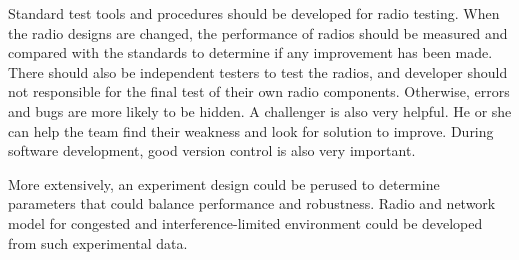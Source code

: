 Standard test tools and procedures should be developed for radio testing. When the radio designs are changed, the performance of radios should be measured and compared with the standards to determine if any improvement has been made. There should also be independent testers to test the radios, and developer should not responsible for the final test of their own radio components. Otherwise, errors and bugs are more likely to be hidden. A challenger is also very helpful. He or she can help the team find their weakness and look for solution to improve. During software development, good version control is also very important.

More extensively, an experiment design could be perused to determine parameters that could balance performance and robustness. Radio and network model for congested and interference-limited environment could be developed from such experimental data.
